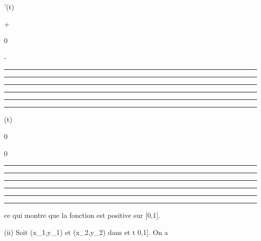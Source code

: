 \documentclass[]{article}
\begin{document}
\phi'(t)

+

0

-

\begin{center}\rule{3in}{0.4pt}\end{center}

\begin{center}\rule{3in}{0.4pt}\end{center}

\begin{center}\rule{3in}{0.4pt}\end{center}

\begin{center}\rule{3in}{0.4pt}\end{center}

\begin{center}\rule{3in}{0.4pt}\end{center}

\begin{center}\rule{3in}{0.4pt}\end{center}

\phi(t)

0

\nearrow

\searrow

0

\begin{center}\rule{3in}{0.4pt}\end{center}

\begin{center}\rule{3in}{0.4pt}\end{center}

\begin{center}\rule{3in}{0.4pt}\end{center}

\begin{center}\rule{3in}{0.4pt}\end{center}

\begin{center}\rule{3in}{0.4pt}\end{center}

\begin{center}\rule{3in}{0.4pt}\end{center}

ce qui montre que la fonction \phi est positive sur {[}0,1{]}.

(ii) Soit (x\_1,y\_1) et (x\_2,y\_2)
dans \Gamma et t \in {[}0,1{]}. On a
\end{document}
